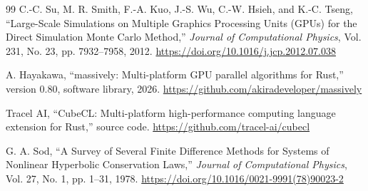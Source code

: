 \documentclass[a4paper,11pt]{ltjsarticle}
\begin{document}
\begin{thebibliography}{99}
C.-C. Su, M. R. Smith, F.-A. Kuo, J.-S. Wu, C.-W. Hsieh, and K.-C. Tseng,
``Large-Scale Simulations on Multiple Graphics Processing Units (GPUs) for the
Direct Simulation Monte Carlo Method,''
\textit{Journal of Computational Physics}, Vol. 231, No. 23, pp. 7932--7958,
2012.
\url{https://doi.org/10.1016/j.jcp.2012.07.038}

A. Hayakawa, ``massively: Multi-platform GPU parallel algorithms for Rust,''
version 0.80, software library, 2026.
\url{https://github.com/akiradeveloper/massively}

Tracel AI, ``CubeCL: Multi-platform high-performance computing language
extension for Rust,'' source code.
\url{https://github.com/tracel-ai/cubecl}

G. A. Sod, ``A Survey of Several Finite Difference Methods for Systems of
Nonlinear Hyperbolic Conservation Laws,''
\textit{Journal of Computational Physics}, Vol. 27, No. 1, pp. 1--31, 1978.
\url{https://doi.org/10.1016/0021-9991(78)90023-2}

\end{thebibliography}
\end{document}
